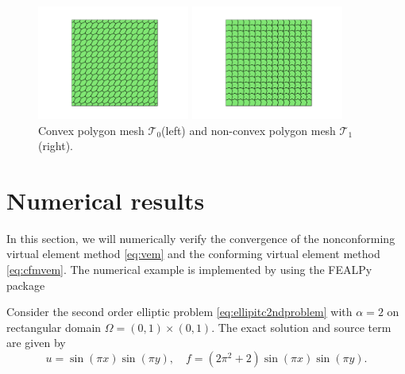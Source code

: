 \documentclass[10pt]{amsart}
\newtheorem{example}[theorem]{Example}
\numberwithin{equation}{section}
\begin{document}
\begin{figure}[htbp]
\centering
\begin{minipage}[t]{0.49\linewidth}
\centering
\includegraphics[width=5cm]{./figures/convex.pdf}
\end{minipage}%
\begin{minipage}[t]{0.49\linewidth}
\centering
\includegraphics[width=5cm]{./figures/nonconvex.pdf}
\end{minipage}%
\centering
\caption{Convex polygon mesh $\mathcal T_0$(left) and non-convex polygon mesh 
$\mathcal T_1$(right).}
\label{fig:mesh}
\end{figure}




\section{Numerical results}\label{sec:numericalexamps}
In this section, we will numerically verify the convergence of the nonconforming virtual element method \eqref{eq:vem} and the conforming
virtual element method \eqref{eq:cfmvem}.
The numerical example is implemented by using the FEALPy package \cite{fealpy}

Consider the second order elliptic problem \eqref{eq:ellipitc2ndproblem} with $\alpha = 2$
on rectangular domain $\Omega = (0, 1)\times(0, 1)$. 
The exact solution and source term are given by
\[
u = \sin(\pi x)\sin(\pi y), \quad f = (2\pi^2+2)\sin(\pi x)\sin(\pi y).
\]
\end{document}
